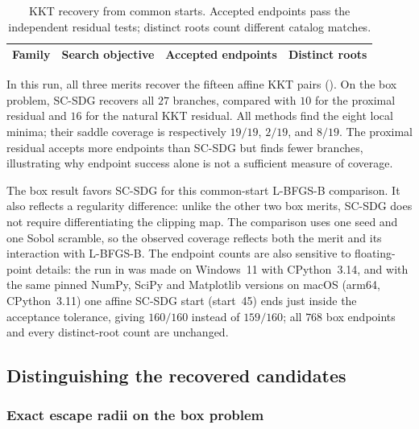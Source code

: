\begin{table}[htbp]
  \centering
  \caption{KKT recovery from common starts.  Accepted endpoints pass the
  independent residual tests; distinct roots count different catalog matches.}
  \label{tab:root-recovery}
  \small
  \setlength{\tabcolsep}{6pt}
  \begin{tabular}{@{}llcc@{}}
    \toprule
    Family & Search objective & Accepted endpoints & Distinct roots\\
    \midrule
    
  \end{tabular}
\end{table}

In this run, all three merits recover the fifteen affine KKT pairs
().  On the box problem, SC-SDG recovers all
\(27\) branches, compared with \(10\) for the proximal residual and \(16\)
for the natural KKT residual.  All methods find the eight local minima;
their saddle coverage is respectively \(19/19\), \(2/19\), and \(8/19\).
The proximal residual accepts more endpoints than SC-SDG but finds fewer
branches, illustrating why endpoint success alone is not a sufficient
measure of coverage.

The box result favors SC-SDG for this common-start L-BFGS-B comparison.
It also reflects a regularity difference: unlike the other two box
merits, SC-SDG does not require differentiating the clipping map.
The comparison uses one seed and one Sobol scramble, so the observed
coverage reflects both the merit and its interaction with L-BFGS-B.
The endpoint counts are also sensitive to floating-point details: the run in
 was made on Windows~11 with CPython~3.14, and with
the same pinned NumPy, SciPy and Matplotlib versions on macOS (arm64,
CPython~3.11) one affine SC-SDG start (start~45) ends just inside the
acceptance tolerance, giving \(160/160\) instead of \(159/160\); all
\(768\) box endpoints and every distinct-root count are unchanged.

\subsection{Distinguishing the recovered candidates}
\label{subsec:experiments-escape}

\subsubsection{Exact escape radii on the box problem}


